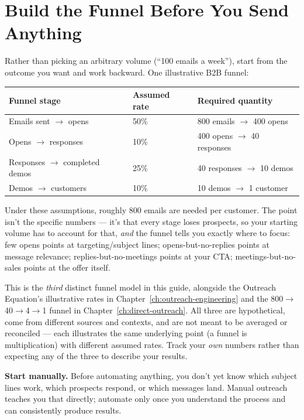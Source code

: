 \section{Build the Funnel Before You Send Anything}

Rather than picking an arbitrary volume (``100 emails a week''), start from the outcome you want and work
backward. One illustrative B2B funnel:

\begin{longtable}{p{} p{} p{}}
\toprule
\textbf{Funnel stage} & \textbf{Assumed rate} & \textbf{Required quantity} \\
\midrule
\endhead
Emails sent $\rightarrow$ opens & 50\% & 800 emails $\rightarrow$ 400 opens \\
Opens $\rightarrow$ responses & 10\% & 400 opens $\rightarrow$ 40 responses \\
Responses $\rightarrow$ completed demos & 25\% & 40 responses $\rightarrow$ 10 demos \\
Demos $\rightarrow$ customers & 10\% & 10 demos $\rightarrow$ 1 customer \\
\bottomrule
\end{longtable}

Under these assumptions, roughly 800 emails are needed per customer. The point isn't the specific numbers — it's
that every stage loses prospects, so your starting volume has to account for that, \emph{and} the funnel tells
you exactly where to focus: few opens points at targeting/subject lines; opens-but-no-replies points at message
relevance; replies-but-no-meetings points at your CTA; meetings-but-no-sales points at the offer itself.

\begin{caution}
This is the \emph{third} distinct funnel model in this guide, alongside the Outreach Equation's illustrative
rates in Chapter~\ref{ch:outreach-engineering} and the 800$\to$40$\to$4$\to$1 funnel in
Chapter~\ref{ch:direct-outreach}. All three are hypothetical, come from different sources and contexts, and are
not meant to be averaged or reconciled — each illustrates the same underlying point (a funnel is multiplication)
with different assumed rates. Track your \emph{own} numbers rather than expecting any of the three to describe
your results.
\end{caution}

\textbf{Start manually.} Before automating anything, you don't yet know which subject lines work, which
prospects respond, or which messages land. Manual outreach teaches you that directly; automate only once you
understand the process and can consistently produce results.

